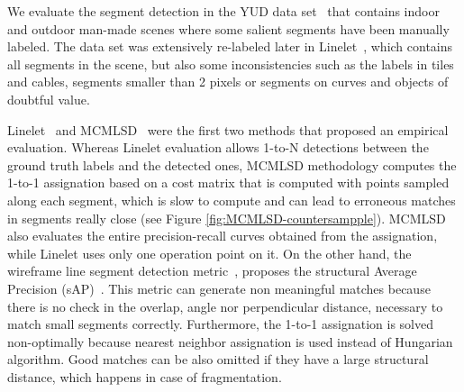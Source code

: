 \documentclass[preprint,12pt]{elsarticle}
\begin{document}
We evaluate the segment detection in the YUD data set~\cite{denis2008efficient} that contains indoor and outdoor man-made scenes where some salient segments have been manually labeled. The data set was extensively re-labeled later in Linelet~\cite{cho2017novel}, which contains all segments in the scene, but also some inconsistencies such as the labels in tiles and cables, segments smaller than 2 pixels or segments on curves and objects of doubtful value. 

Linelet~\cite{cho2017novel} and MCMLSD~\cite{almazan2017mcmlsd} were the first two methods that proposed an empirical evaluation. Whereas Linelet evaluation allows 1-to-N detections between the ground truth labels and the detected ones, MCMLSD methodology computes the 1-to-1 assignation based on a cost matrix  that is computed with points sampled along each segment, which is slow to compute and can lead to erroneous matches in segments really close (see Figure \ref{fig:MCMLSD-countersampple}). MCMLSD also evaluates the entire precision-recall curves obtained from the assignation, while Linelet uses only one operation point on it.
On the other hand, the wireframe line segment detection metric~\cite{huang2018wireframe}, proposes the structural Average Precision (sAP)~\cite{zhou2019end}. This metric can generate non meaningful matches because there is no check in the overlap, angle nor perpendicular distance, necessary to match small segments correctly. Furthermore, the 1-to-1 assignation is solved non-optimally because nearest neighbor assignation is used instead of Hungarian algorithm. Good matches can be also omitted if they have a large structural distance, which happens in case of fragmentation.
\end{document}
